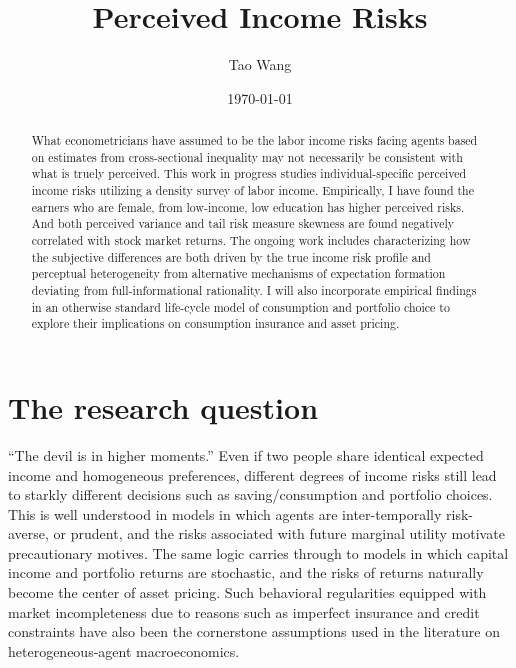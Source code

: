 \documentclass[12pt,notitlepage,onecolumn,aps,pra]{article}
\begin{document}
    
    
    \title{Perceived Income Risks}\author{Tao Wang}

\date{\today}
\maketitle\begin{abstract}What econometricians have assumed to be the labor income risks facing agents based on estimates from cross-sectional inequality may not necessarily be consistent with what is truely perceived.  This work in progress studies individual-specific perceived income risks utilizing a density survey of labor income. Empirically, I have found the earners who are female, from low-income, low education has higher perceived risks. And both perceived variance and tail risk measure skewness are found negatively correlated with stock market returns. The ongoing work includes characterizing how the subjective differences are both driven by the true income risk profile and perceptual heterogeneity from alternative mechanisms of expectation formation deviating from full-informational rationality. I will also incorporate empirical findings in an otherwise standard life-cycle model of consumption and portfolio choice to explore their implications on consumption insurance and asset pricing.\end{abstract}


    
    

    
    \hypertarget{the-research-question}{%
\section{The research question}\label{the-research-question}}

``The devil is in higher moments.'' Even if two people share identical
expected income and homogeneous preferences, different degrees of income
risks still lead to starkly different decisions such as
saving/consumption and portfolio choices. This is well understood in
models in which agents are inter-temporally risk-averse, or prudent, and
the risks associated with future marginal utility motivate precautionary
motives. The same logic carries through to models in which capital
income and portfolio returns are stochastic, and the risks of returns
naturally become the center of asset pricing. Such behavioral
regularities equipped with market incompleteness due to reasons such as
imperfect insurance and credit constraints have also been the
cornerstone assumptions used in the literature on heterogeneous-agent
macroeconomics.
\end{document}
